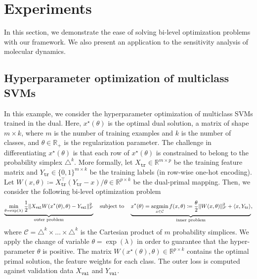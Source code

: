 \documentclass{article}
\def\cC{{\mathcal{C}}}
\def\RR{{\mathbb R}}
\DeclareMathOperator*{\argmin}{argmin}
\def\training{{\mathtt{tr}}}
\def\validation{{\mathtt{val}}}
\begin{document}
\section{Experiments}
\label{sec:exp}

In this section, we demonstrate the ease of solving bi-level
optimization problems with our framework. We also present an
application to the sensitivity analysis of molecular dynamics.

\subsection{Hyperparameter optimization of multiclass SVMs}

In this example, we consider the hyperparameter optimization of multiclass SVMs
\cite{crammer_2001}
trained in the dual. Here, $x^\star(\theta)$ is the optimal dual
solution, a matrix of shape $m \times k$, where $m$ is the number of training
examples and $k$ is the number of classes, and $\theta \in \RR_+$ is the
regularization parameter. The challenge
in differentiating $x^\star(\theta)$ is that each row of $x^\star(\theta)$
is constrained to belong to the probability simplex $\triangle^k$. More formally,
let $X_\training \in \RR^{m \times p}$ be the training feature matrix and
$Y_\training \in 
\{0, 1\}^{m \times k}$ be the training labels (in row-wise one-hot encoding). 
Let $W(x, \theta) \coloneqq X_\training^\top (Y_\training - x) / \theta \in
\RR^{p \times k}$ be the dual-primal mapping.
Then, we consider the following bi-level optimization problem
\begin{equation}
\small
\underbrace{\min_{\theta = \exp(\lambda)}
\frac{1}{2} \|X_\validation W(x^\star(\theta), \theta) -
Y_\validation\|^2_F}_{\text{outer problem}}
\quad \text{subject to} \quad
\underbrace{x^\star(\theta) = \argmin_{x \in \cC} 
f(x, \theta) \coloneqq \frac{\theta}{2} \|W(x, \theta)\|^2_F
+ \langle x, Y_\training \rangle}_{\text{inner problem}},
\label{eq:multiclass_svm_obj}
\end{equation}
where $\cC = \triangle^k \times \dots \times \triangle^k$ is the Cartesian
product of $m$ probability simplices.
We apply the change of variable $\theta = \exp(\lambda)$ in order to guarantee
that the hyper-parameter $\theta$ is positive.
The matrix $W(x^\star(\theta), \theta) \in \RR^{p
\times k}$ contains the optimal primal solution, the feature weights for each
class.  The outer loss is computed against validation data $X_\validation$ and
$Y_\validation$. 
\end{document}

